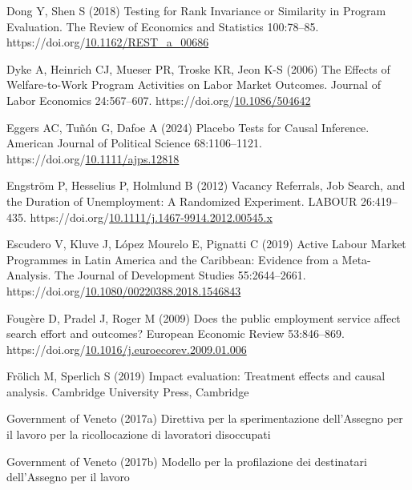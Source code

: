 \documentclass[
  11pt]{article}
\newlength{\cslhangindent}
\newenvironment{CSLReferences}[2] %
 {\begin{list}{}{%
  \setlength{\itemindent}{0pt}
  \setlength{\leftmargin}{0pt}
  \setlength{\parsep}{0pt}
  \ifodd #1
   \setlength{\leftmargin}{\cslhangindent}
   \setlength{\itemindent}{-1\cslhangindent}
  \fi
  \setlength{\itemsep}{#2\baselineskip}}}
 {\end{list}}
\begin{document}
\begin{CSLReferences}{1}{1}
Dong Y, Shen S (2018) Testing for {Rank Invariance} or {Similarity} in
{Program Evaluation}. The Review of Economics and Statistics 100:78--85.
https://doi.org/\href{https://doi.org/10.1162/REST_a_00686}{10.1162/REST\_a\_00686}

Dyke A, Heinrich CJ, Mueser PR, Troske KR, Jeon K-S (2006) The {Effects}
of {Welfare}-to-{Work Program Activities} on {Labor Market Outcomes}.
Journal of Labor Economics 24:567--607.
https://doi.org/\href{https://doi.org/10.1086/504642}{10.1086/504642}

Eggers AC, Tuñón G, Dafoe A (2024) Placebo {Tests} for {Causal
Inference}. American Journal of Political Science 68:1106--1121.
https://doi.org/\href{https://doi.org/10.1111/ajps.12818}{10.1111/ajps.12818}

Engström P, Hesselius P, Holmlund B (2012) Vacancy {Referrals}, {Job
Search}, and the {Duration} of {Unemployment}: {A Randomized
Experiment}. LABOUR 26:419--435.
https://doi.org/\href{https://doi.org/10.1111/j.1467-9914.2012.00545.x}{10.1111/j.1467-9914.2012.00545.x}

Escudero V, Kluve J, López Mourelo E, Pignatti C (2019) Active {Labour
Market Programmes} in {Latin America} and the {Caribbean}: {Evidence}
from a {Meta-Analysis}. The Journal of Development Studies
55:2644--2661.
https://doi.org/\href{https://doi.org/10.1080/00220388.2018.1546843}{10.1080/00220388.2018.1546843}

Fougère D, Pradel J, Roger M (2009) Does the public employment service
affect search effort and outcomes? European Economic Review 53:846--869.
https://doi.org/\href{https://doi.org/10.1016/j.euroecorev.2009.01.006}{10.1016/j.euroecorev.2009.01.006}

Frölich M, Sperlich S (2019) Impact evaluation: Treatment effects and
causal analysis. Cambridge University Press, Cambridge

Government of Veneto (2017a) Direttiva per la sperimentazione
dell'{Assegno} per il lavoro per la ricollocazione di lavoratori
disoccupati

Government of Veneto (2017b) Modello per la profilazione dei destinatari
dell'{Assegno} per il lavoro


\end{CSLReferences}
\end{document}
